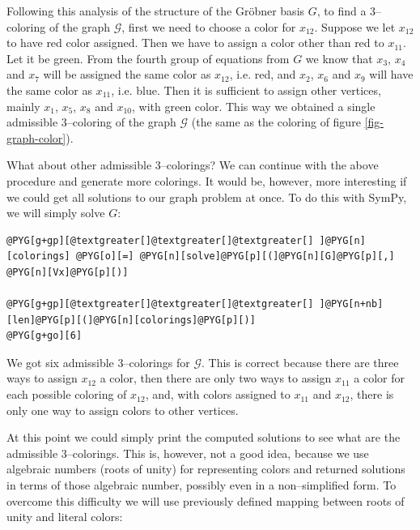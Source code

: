 Following this analysis of the structure of the Gröbner basis $G$, to find a $3$--coloring of
the graph $\mathcal{G}$, first we need to choose a color for $x_{12}$. Suppose we let $x_{12}$ to
have red color assigned. Then we have to assign a color other than red to $x_{11}$. Let it be green.
From the fourth group of equations from $G$ we know that $x_3$, $x_4$ and $x_7$ will be assigned the
same color as $x_{12}$, i.e. red, and $x_2$, $x_6$ and $x_9$ will have the same color as $x_{11}$,
i.e. blue. Then it is sufficient to assign other vertices, mainly $x_1$, $x_5$, $x_8$ and $x_{10}$,
with green color. This way we obtained a single admissible $3$--coloring of the graph $\mathcal{G}$
(the same as the coloring of figure \ref{fig-graph-color}).

What about other admissible $3$--colorings? We can continue with the above procedure and generate
more colorings. It would be, however, more interesting if we could get all solutions to our graph
problem at once. To do this with SymPy, we will simply solve $G$:

\begin{Verbatim}[commandchars=@\[\]]
@PYG[g+gp][@textgreater[]@textgreater[]@textgreater[] ]@PYG[n][colorings] @PYG[o][=] @PYG[n][solve]@PYG[p][(]@PYG[n][G]@PYG[p][,] @PYG[n][Vx]@PYG[p][)]

@PYG[g+gp][@textgreater[]@textgreater[]@textgreater[] ]@PYG[n+nb][len]@PYG[p][(]@PYG[n][colorings]@PYG[p][)]
@PYG[g+go][6]
\end{Verbatim}
\noindent
We got six admissible $3$--colorings for $\mathcal{G}$. This is correct because there are three ways
to assign $x_{12}$ a color, then there are only two ways to assign $x_{11}$ a color for each possible
coloring of $x_{12}$, and, with colors assigned to $x_{11}$ and $x_{12}$, there is only one way to
assign colors to other vertices.

At this point we could simply print the computed solutions to see what are the admissible $3$--colorings.
This is, however, not a good idea, because we use algebraic numbers (roots of unity) for representing colors
and  returned solutions in terms of those algebraic number, possibly even in a non--simplified
form. To overcome this difficulty we will use previously defined mapping between roots of unity and literal
colors:

